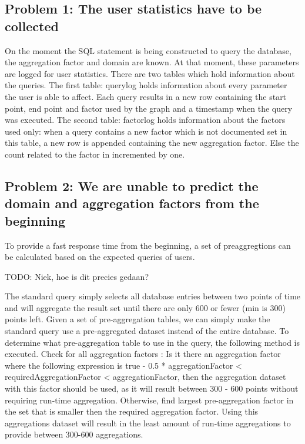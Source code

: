 \subsection{Problem 1: The user statistics have to be collected}
On the moment the SQL statement is being constructed to query the database, the aggregation factor and domain are known. At that moment, these parameters are logged for user statistics.
There are two tables which hold information about the queries. The first table: querylog holds information about every parameter the user is able to affect. Each query results in a new row containing the start point, end point and factor used by the graph and a timestamp when the query was executed. The second table: factorlog holds information about the factors used only: when a query contains a new factor which is not documented set in this table, a new row is appended containing the new aggregation factor. Else the count related to the factor in incremented by one.\\

\subsection{Problem 2: We are unable to predict the domain and aggregation factors from the beginning}
To provide a fast response time from the beginning, a set of preaggregtions can be calculated based on the expected queries of users. 

TODO: Niek, hoe is dit precies gedaan?

The standard query simply selects all database entries between two points of time and will aggregate the result set until there are only 600 or fewer (min is 300) points left. Given a set of pre-aggregation tables, we can simply make the standard query use a pre-aggregated dataset instead of the entire database. To determine what pre-aggregation table to use in the query, the following method is executed. Check for all aggregation factors : Is it there an aggregation factor where the following expression is true - 0.5 * aggregationFactor < requiredAggregationFactor < aggregationFactor, then the aggregation dataset with this factor should be used, as it will result between 300 - 600 points without requiring run-time aggregation. Otherwise, find largest pre-aggregation factor in the set that is smaller then the required aggregation factor. Using this aggregations dataset will result in the least amount of run-time aggregations to provide between 300-600 aggregations.

